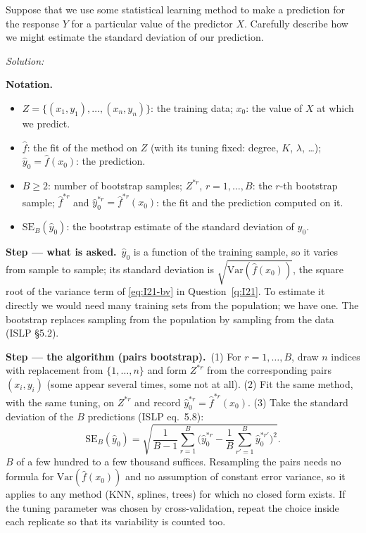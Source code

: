 \documentclass[11pt,a4paper]{article}
\newif\ifsolucoes
\newcommand{\espacoresol}{3.5cm}   %
\numberwithin{equation}{questao}   %
\newenvironment{notacao}{\par\smallskip\noindent\textbf{Notation.}\begin{itemize}[leftmargin=1.4em,topsep=1pt,itemsep=0pt]\small}{\end{itemize}}
\newcommand{\resolespaco}{\ifsolucoes\else\par\textit{Solution:}\vspace{\espacoresol}\par\fi}
\newcommand{\passo}[2]{\par\smallskip\noindent\textbf{Step --- #1.}~#2}
\begin{document}
Suppose that we use some statistical learning method to make a prediction for the response $Y$ for a
particular value of the predictor $X$. Carefully describe how we might estimate the standard deviation
of our prediction.
\resolespaco
\begin{sol}
\begin{notacao}
\item $Z=\{(x_1,y_1),\dots,(x_n,y_n)\}$: the training data; $x_0$: the value of $X$ at which we predict.
\item $\hat f$: the fit of the method on $Z$ (with its tuning fixed: degree, $K$, $\lambda$, \dots);
  $\hat y_0=\hat f(x_0)$: the prediction.
\item $B\ge2$: number of bootstrap samples; $Z^{*r}$, $r=1,\dots,B$: the $r$-th bootstrap sample;
  $\hat f^{*r}$ and $\hat y_0^{*r}=\hat f^{*r}(x_0)$: the fit and the prediction computed on it.
\item $\mathrm{SE}_B(\hat y_0)$: the bootstrap estimate of the standard deviation of $\hat y_0$.
\end{notacao}

\passo{what is asked}{$\hat y_0$ is a function of the training sample, so it varies from sample to
sample; its standard deviation is $\sqrt{\mathrm{Var}(\hat f(x_0))}$, the square root of the variance
term of \eqref{eq:I21-bv} in Question~\ref{q:I21}. To estimate it directly we would need many training
sets from the population; we have one. The bootstrap replaces sampling from the population by
sampling from the data (ISLP §5.2).}

\passo{the algorithm (pairs bootstrap)}{(1) For $r=1,\dots,B$, draw $n$ indices with replacement from
$\{1,\dots,n\}$ and form $Z^{*r}$ from the corresponding pairs $(x_i,y_i)$ (some appear several times,
some not at all). (2) Fit the same method, with the same tuning, on $Z^{*r}$ and record
$\hat y_0^{*r}=\hat f^{*r}(x_0)$. (3) Take the standard deviation of the $B$ predictions (ISLP
eq.~5.8):
\begin{equation}\label{eq:I54-seB}
\mathrm{SE}_B(\hat y_0)=\sqrt{\frac1{B-1}\sum_{r=1}^B\Big(\hat y_0^{*r}-\frac1B\sum_{r'=1}^B\hat y_0^{*r'}\Big)^2}.
\end{equation}
$B$ of a few hundred to a few thousand suffices. Resampling the pairs needs no formula for
$\mathrm{Var}(\hat f(x_0))$ and no assumption of constant error variance, so it applies to any method
(KNN, splines, trees) for which no closed form exists. If the tuning parameter was chosen by
cross-validation, repeat the choice inside each replicate so that its variability is counted too.}


\end{sol}
\end{document}
